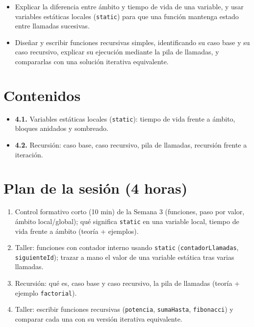 \documentclass[11pt,letterpaper]{article}
\begin{document}
\begin{itemize}[leftmargin=1.2cm]
  \item[\textbf{RA3.3.}] Explicar la diferencia entre ámbito y tiempo de vida de una variable, y
        usar variables estáticas locales (\texttt{static}) para que una función mantenga estado
        entre llamadas sucesivas.
  \item[\textbf{RA3.4.}] Diseñar y escribir funciones recursivas simples, identificando su caso
        base y su caso recursivo, explicar su ejecución mediante la pila de llamadas, y compararlas
        con una solución iterativa equivalente.
\end{itemize}

\section{Contenidos}

\begin{itemize}[leftmargin=1.2cm]
  \item \textbf{4.1.} Variables estáticas locales (\texttt{static}): tiempo de vida frente a
        ámbito, bloques anidados y sombreado.
  \item \textbf{4.2.} Recursión: caso base, caso recursivo, pila de llamadas, recursión frente a
        iteración.
\end{itemize}

\section{Plan de la sesión (4 horas)}

\begin{enumerate}[leftmargin=1.2cm]
  \item[\textbf{Hora 1.}] Control formativo corto (10 min) de la Semana 3 (funciones, paso por
        valor, ámbito local/global); qué significa \texttt{static} en una variable local, tiempo de
        vida frente a ámbito (teoría + ejemplos).
  \item[\textbf{Hora 2.}] Taller: funciones con contador interno usando \texttt{static}
        (\texttt{contadorLlamadas}, \texttt{siguienteId}); trazar a mano el valor de una variable
        estática tras varias llamadas.
  \item[\textbf{Hora 3.}] Recursión: qué es, caso base y caso recursivo, la pila de llamadas
        (teoría + ejemplo \texttt{factorial}).
  \item[\textbf{Hora 4.}] Taller: escribir funciones recursivas (\texttt{potencia},
        \texttt{sumaHasta}, \texttt{fibonacci}) y comparar cada una con su versión iterativa
        equivalente.
\end{enumerate}
\end{document}
